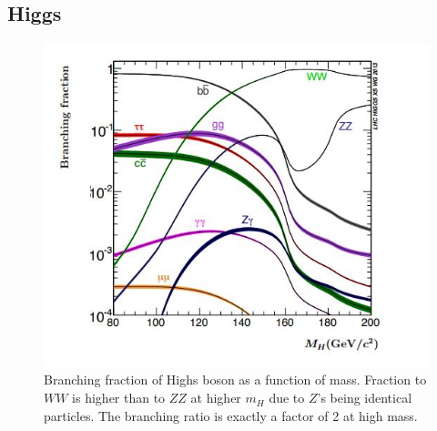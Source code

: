 \subsection{Higgs}


\begin{figure}
\includegraphics[width=\textwidth]{physics/images/higgs_br.jpg}
\caption{Branching fraction of Highs boson as a function of mass. Fraction to $WW$ is higher than to $ZZ$ at higher $m_H$ due to $Z$'s being identical particles. The branching ratio is exactly a factor of 2 at high mass.}
\end{figure}


